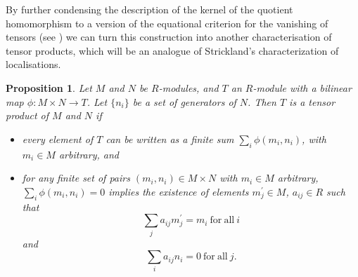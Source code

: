 \documentclass{amsart}
\theoremstyle{plain}
\numberwithin{equation}{section} %
\numberwithin{figure}{section} %
\theoremstyle{plain}
\theoremstyle{plain}
\theoremstyle{plain}
\theoremstyle{plain}
\theoremstyle{plain}
\newtheorem{prop}[thm]{Proposition} %
\theoremstyle{plain}
\theoremstyle{remark}
\theoremstyle{remark}
\theoremstyle{remark}
\begin{document}
By further condensing the description of the kernel of the quotient homomorphism to a version of the equational criterion for the vanishing of tensors (see \cite[Lem.6.4]{ECA}) we can turn this construction into another characterisation of tensor products, which will be an analogue of Strickland's characterization of localisations.
\begin{prop} \label{eq-char-tensor-prop}
Let $M$ and $N$ be $R$-modules, and $T$ an $R$-module with a bilinear map $\phi: M \times N \rightarrow T$. Let $\{n_i\}$ be a set of generators of $N$. Then $T$ is a tensor product of $M$ and $N$ if
\begin{itemize} 
\item every element of $T$ can be written as a finite sum $\sum_i \phi(m_i, n_i)$, with $m_i \in M$ arbitrary, and
\item for any finite set of pairs $(m_i, n_i) \in M \times N$ with $m_i \in M$ arbitrary, $\sum_i \phi(m_i, n_i) = 0$ implies the existence of elements $m_j^\prime \in M$, $a_{ij} \in R$ such that
\[ \sum_j a_{ij}m_j^\prime = m_i\ \mathrm{for\ all\ } i \]
and
\[ \sum_i a_{ij}n_i = 0\ \mathrm{for\ all\ } j. \] 
\end{itemize}
\end{prop}
\end{document}
